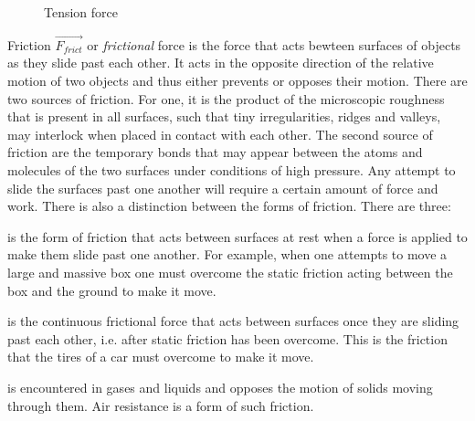 \begin{figure}[h!]
	\centering
    \caption{Tension force}
\end{figure}


Friction $\vec{F_{frict}}$ or \emph{frictional} force is the force that acts bewteen surfaces of objects as they slide past each other. It acts in the opposite direction of the relative motion of two objects and thus either prevents or opposes their motion. There are two sources of friction. For one, it is the product of the microscopic roughness that is present in all surfaces, such that tiny irregularities, ridges and valleys, may interlock when placed in contact with each other. The second source of friction are the temporary bonds that may appear between the atoms and molecules of the two surfaces under conditions of high pressure. Any attempt to slide the surfaces past one another will require a certain amount of force and work. There is also a distinction between the forms of friction. There are three: 

\begin{itemize}
	 is the form of friction that acts between surfaces at rest when a force is applied to make them slide past one another. For example, when one attempts to move a large and massive box one must overcome the static friction acting between the box and the ground to make it move.

	 is the continuous frictional force that acts between surfaces once they are sliding past each other, i.e. after static friction has been overcome. This is the friction that the tires of a car must overcome to make it move.

	 is encountered in gases and liquids and opposes the motion of solids moving through them. Air resistance is a form of such friction.
\end{itemize}


